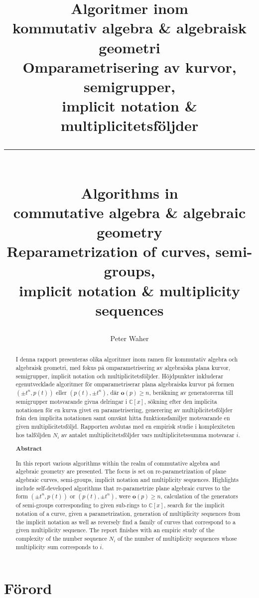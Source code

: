 \documentclass[twoside]{report}
\title{Algoritmer inom \\
	kommutativ algebra \& algebraisk geometri \\[20pt]
	\large Omparametrisering av kurvor, semigrupper, \\
	implicit notation \& multiplicitetsföljder\\[15pt]
	\hrule \\[15pt]
	\Large Algorithms in\\
	commutative algebra \& algebraic geometry \\[20pt]
	\large Reparametrization of curves, semi-groups, \\
	implicit notation \& multiplicity sequences\\[20pt]}
\author{Peter Waher}
\begin{document}
\maketitle

\begin{abstract}
I denna rapport presenteras olika algoritmer inom ramen för kommutativ algebra och algebraisk geometri, med fokus på omparametrisering av algebraiska plana kurvor, semigrupper, implicit notation och multiplicitetsföljder. Höjdpunkter inkluderar egenutvecklade algoritmer för omparametriserar plana algebraiska kurvor på formen $(\pm t^n, p(t))$ eller $(p(t), \pm t^n)$, där $\mathbf{o}(p)\geq n$, beräkning av generatorerna till semigrupper motsvarande givna delringar i $\mathbb{C}[x]$, sökning efter den implicita notationen för en kurva givet en parametrisering, generering av multiplicitetsföljder från den implicita notationen samt omvänt hitta funktionsfamiljer motsvarande en given multiplicitetsföljd. Rapporten avslutas med en empirisk studie i komplexiteten hos talföljden $N_i$ av antalet multiplicitetsföljder vars multiplicitetssumma motsvarar $i$. 

\begin{center}
	\textbf{Abstract}
\end{center}

In this report various algorithms within the realm of commutative algebra and algebraic geometry are presented. The focus is set on re-parametrization of plane algebraic curves, semi-groups, implicit notation and multiplicity sequences. Highlights include self-developed algorithms that re-parametrize plane algebraic curves to the form $(\pm t^n, p(t))$ or $(p(t), \pm t^n)$, were $\mathbf{o}(p)\geq n$, calculation of the generators of semi-groups corresponding to given sub-rings to $\mathbb{C}[x]$, search for the implicit notation of a curve, given a parametrization, generation of multiplicity sequences from the implicit notation as well as reversely find a family of curves that correspond to a given multiplicity sequence. The report finishes with an empiric study of the complexity of the number sequence $N_i$ of the number of multiplicity sequences whose multiplicity sum corresponds to $i$.
\end{abstract}

\section*{Förord}
\end{document}
